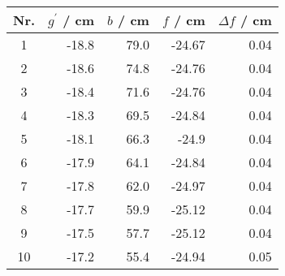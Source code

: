 \begin{tabular}{c|rrrr}
Nr. & $g^\prime$ / cm & $b$ / cm & $f$ / cm & $\Delta f$ / cm \\
\hline
1 & -18.8 & 79.0 & -24.67 & 0.04\\
2 & -18.6 & 74.8 & -24.76 & 0.04\\
3 & -18.4 & 71.6 & -24.76 & 0.04\\
4 & -18.3 & 69.5 & -24.84 & 0.04\\
5 & -18.1 & 66.3 & -24.9 & 0.04\\
6 & -17.9 & 64.1 & -24.84 & 0.04\\
7 & -17.8 & 62.0 & -24.97 & 0.04\\
8 & -17.7 & 59.9 & -25.12 & 0.04\\
9 & -17.5 & 57.7 & -25.12 & 0.04\\
10 & -17.2 & 55.4 & -24.94 & 0.05
\end{tabular}
